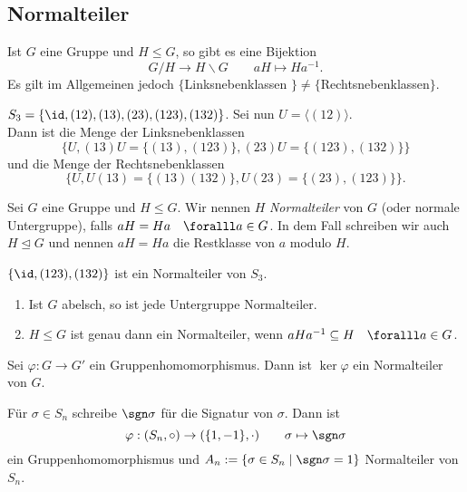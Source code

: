 \subsection*{Normalteiler}\lecture

Ist $G$ eine Gruppe und $H \leq G$, so gibt es eine Bijektion
$$G/H \to H \backslash G \qquad aH \mapsto Ha^{-1}.$$
Es gilt im Allgemeinen jedoch $\{$Linksnebenklassen $\} \neq \{$Rechtsnebenklassen$\}$.

\begin{exmp*}
	$ S_3 = \{\id, (12),(13),(23),(123),(132)\} $. Sei nun $U = \langle (12) \rangle$.\\
	Dann ist die Menge der Linksnebenklassen 
	$$\big\{U,(13)U = \{(13),(123)\}, (23)U = \{(123),(132)\}\big\}$$ 
	und die Menge der Rechtsnebenklassen 
	$$ \big\{U,U(13) = \{(13)(132)\}, U(23) = \{(23),(123)\}\big\}. $$
\end{exmp*}

\begin{defn*}[Normalteiler]
	Sei $G$ eine Gruppe und $H \leq G$. Wir nennen $H$ \emph{Normalteiler} von $G$ (oder normale Untergruppe), falls $aH = Ha \quad \foralll a \in G$. In dem Fall schreiben wir auch $ H \unlhd G $ und nennen $aH = Ha$ die Restklasse von $a$ modulo $H$.
\end{defn*}

\begin{exmp*}
	$ \{\id, (123), (132)\} $ ist ein Normalteiler von $S_3$.
\end{exmp*}

\begin{rem*}
	\begin{enumerate}[label=({\roman*})]
		\item Ist $G$ abelsch, so ist jede Untergruppe Normalteiler.
		\item $H \leq G$ ist genau dann ein Normalteiler, wenn $aHa^{-1} \subseteq H \quad \foralll a \in G$.
	\end{enumerate}
\end{rem*}

\begin{lem}
	Sei $\varphi: G \to G'$ ein Gruppenhomomorphismus. Dann ist $\ker\varphi$ ein Normalteiler von $G$.
\end{lem}

\begin{exmp*}
	Für $\sigma \in S_n$ schreibe $\sgn \sigma$ für die Signatur von $\sigma$. Dann ist
	\[ \varphi: (S_n, \circ) \to (\{1,-1\}, \cdot) \qquad \sigma \mapsto \sgn \sigma \]
	ein Gruppenhomomorphismus und $A_n := \{\sigma \in S_n \mid \sgn \sigma = 1\}$ Normalteiler von $S_n$.
\end{exmp*}

